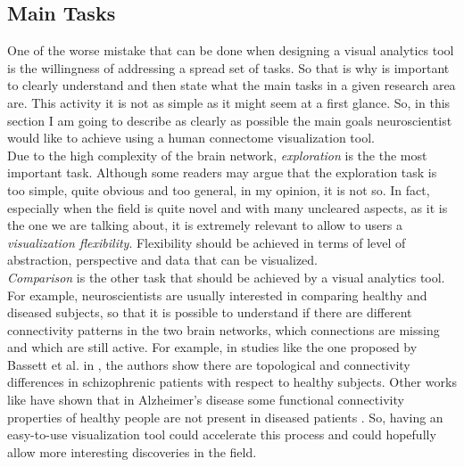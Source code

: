 \documentclass{article}
\begin{document}
\begin{multicols}{2}
\section{Main Tasks}
\label{sec:mainTasks}
One of the worse mistake that can be done when designing a visual analytics tool is the willingness of addressing a spread set of tasks. So that is why is important to clearly understand and then state what the main tasks in a given research area are. This activity it is not as simple as it might seem at a first glance. So, in this section I am going to describe as clearly as possible the main goals neuroscientist would like to achieve using a human connectome visualization tool.\\

Due to the high complexity of the brain network, \textit{exploration} is the the most important task. Although some readers may argue that the exploration task is too simple, quite obvious and too general, in my opinion, it is not so. In fact, especially when the field is quite novel and with many uncleared aspects, as it is the one we are talking about, it is extremely relevant to allow to users a \textit{visualization flexibility}. Flexibility should be achieved in terms of level of abstraction, perspective and data that can be visualized. \\

\textit{Comparison} is the other task that should be achieved by a visual analytics tool. For example, neuroscientists are usually interested in comparing healthy and diseased subjects, so that it is possible to understand if there are different connectivity patterns in the two brain networks, which connections are missing and which are still active. For example, in studies like the one proposed by Bassett et al. in \cite{hierarchicalOrganization}, the authors show there are topological and connectivity differences in schizophrenic patients with respect to healthy subjects. Other works like \cite{alzheimer} have shown that in Alzheimer's disease some functional connectivity properties of healthy people are not present in diseased patients . So, having an easy-to-use visualization tool could accelerate this process and could hopefully allow more interesting discoveries in the field.


\end{multicols}
\end{document}
